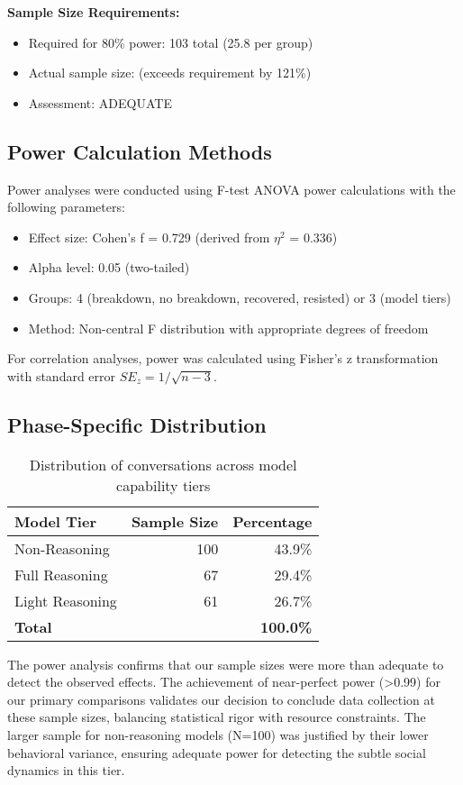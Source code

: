 \documentclass[11pt,letterpaper]{article}
\newcommand{\exponedataTotalSessionsRaw}{67}
\newcommand{\exptwoTotalSessionsRaw}{61}
\newcommand{\expthreeTotalSessionsRaw}{100}
\newcommand{\totalAllPhasesRaw}{\fpeval{\exponedataTotalSessionsRaw + \exptwoTotalSessionsRaw + \expthreeTotalSessionsRaw}}
\newcommand{\powerRequiredN}{103}
\newcommand{\powerRequiredNPerGroup}{25.8}
\newcommand{\powerEtaSquared}{0.336}
\newcommand{\powerCohensF}{0.729}  %
\begin{document}
\textbf{Sample Size Requirements:}
\begin{itemize}
    \item Required for 80\% power: \powerRequiredN{} total (\powerRequiredNPerGroup{} per group)
    \item Actual sample size: \totalAllPhasesRaw{} (exceeds requirement by 121\%)
    \item Assessment: ADEQUATE
\end{itemize}



\subsection{Power Calculation Methods}

Power analyses were conducted using F-test ANOVA power calculations with the following parameters:
\begin{itemize}
    \item Effect size: Cohen's f = \powerCohensF{} (derived from $\eta^2$ = \powerEtaSquared{})
    \item Alpha level: 0.05 (two-tailed)
    \item Groups: 4 (breakdown, no breakdown, recovered, resisted) or 3 (model tiers)
    \item Method: Non-central F distribution with appropriate degrees of freedom
\end{itemize}

For correlation analyses, power was calculated using Fisher's z transformation with standard error $SE_z = 1/\sqrt{n-3}$.


\subsection{Phase-Specific Distribution}

\begin{table}[h]
\centering
\begin{tabular}{lrr}
\toprule
\textbf{Model Tier} & \textbf{Sample Size} & \textbf{Percentage} \\
\midrule
Non-Reasoning & \expthreeTotalSessionsRaw{} & 43.9\% \\
Full Reasoning & \exponedataTotalSessionsRaw{} & 29.4\% \\
Light Reasoning & \exptwoTotalSessionsRaw{} & 26.7\% \\
\midrule
\textbf{Total} & \textbf{\totalAllPhasesRaw{}} & \textbf{100.0\%} \\
\bottomrule
\end{tabular}
\caption{Distribution of conversations across model capability tiers}
\end{table}


The power analysis confirms that our sample sizes were more than adequate to detect the observed effects. The achievement of near-perfect power (>0.99) for our primary comparisons validates our decision to conclude data collection at these sample sizes, balancing statistical rigor with resource constraints. The larger sample for non-reasoning models (N=\expthreeTotalSessionsRaw{}) was justified by their lower behavioral variance, ensuring adequate power for detecting the subtle social dynamics in this tier.
\end{document}
